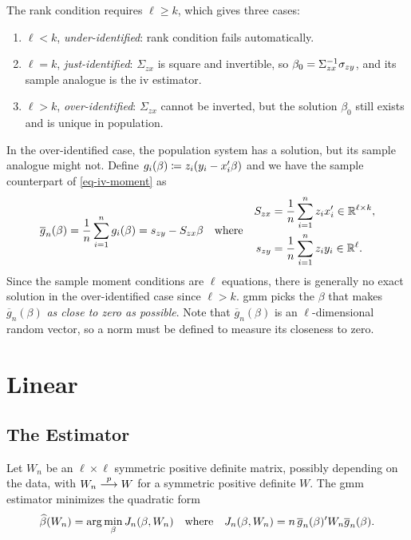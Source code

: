 \documentclass[a4paper,12pt]{article}
\begin{document}
\begin{remark}
	The rank condition requires $\ell\ge k$, which gives three cases:
	\begin{enumerate}
		\item $\ell<k$, \emph{under-identified}: rank condition fails automatically.
		\item $\ell=k$, \emph{just-identified}: $\Sigma_{zx}$ is square and invertible, so $\beta_0=\Sigma_{zx}^{-1}\sigma_{zy}$,
			and its sample analogue is the \gls{iv} estimator.
		\item $\ell>k$, \emph{over-identified}: $\Sigma_{zx}$ cannot be inverted, but the solution $\beta_0$ still exists and is unique in population.
	\end{enumerate}
\end{remark}

\begin{remark}
	In the over-identified case,
	the population system has a solution,
	but its sample analogue might not.
	Define $g_i(\beta)\coloneqq z_i(y_i-x_i^{\prime}\beta)$ and we have the sample counterpart of \eqref{eq-iv-moment} as
	\begin{align}
		\overline g_n(\beta)
		=\frac1n\sum_{i=1}^n g_i(\beta)
		=s_{zy}-S_{zx}\beta
		\quad\text{where}\quad
		\begin{aligned}
			S_{zx} &= \frac1n\sum_{i=1}^nz_ix_i^{\prime} \in\mathbb{R}^{\ell\times k},\\
			s_{zy} &= \frac1n\sum_{i=1}^nz_iy_i \in\mathbb{R}^{\ell}.
		\end{aligned}
	\end{align}
	Since the sample moment conditions are $\ell$ equations,
	there is generally no exact solution in the over-identified case since $\ell>k$.
	\gls{gmm} picks the $\beta$ that makes $\overline g_n(\beta)$ \emph{as close to zero as possible}.
	Note that $\overline g_n(\beta)$ is an $\ell$-dimensional random vector,
	so a norm must be defined to measure its closeness to zero.
\end{remark}

\section{Linear }

\subsection{The Estimator}

\begin{definition}
	Let $W_n$ be an $\ell\times\ell$ symmetric positive definite matrix, possibly depending on the data,
	with $W_n\overset{p}{\longrightarrow} W$ for a symmetric positive definite $W$.
	The \gls{gmm} estimator minimizes the quadratic form
	\begin{align}\label{eq-gmm-objective}
		\widehat\beta(W_n)=\arg\min_\beta J_n(\beta,W_n)
		\quad\text{where}\quad
		J_n(\beta,W_n)=n\,\overline g_n(\beta)^{\prime} W_n\overline g_n(\beta).
	\end{align}
\end{definition}
\end{document}
